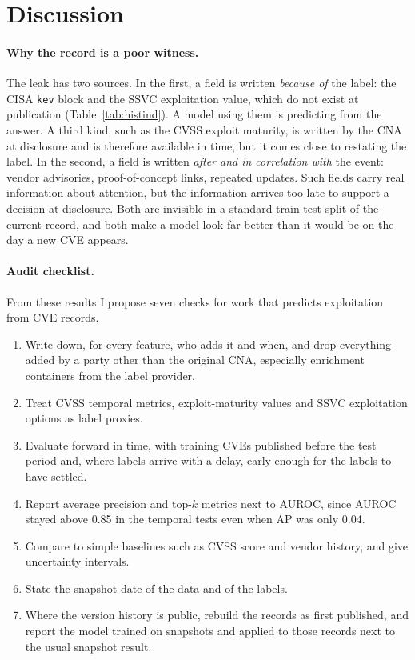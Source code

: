 \documentclass[conference,a4paper]{IEEEtran}
\begin{document}
\section{Discussion}

\paragraph{Why the record is a poor witness.} The leak has two sources. In the first, a field is written \emph{because of} the label: the CISA \texttt{kev} block and the SSVC exploitation value, which do not exist at publication (Table~\ref{tab:histind}). A model using them is predicting from the answer. A third kind, such as the CVSS exploit maturity, is written by the CNA at disclosure and is therefore available in time, but it comes close to restating the label. In the second, a field is written \emph{after and in correlation with} the event: vendor advisories, proof-of-concept links, repeated updates. Such fields carry real information about attention, but the information arrives too late to support a decision at disclosure. Both are invisible in a standard train-test split of the current record, and both make a model look far better than it would be on the day a new CVE appears.

\paragraph{Audit checklist.} From these results I propose seven checks for work that predicts exploitation from CVE records.
\begin{enumerate}
\item Write down, for every feature, who adds it and when, and drop everything added by a party other than the original CNA, especially enrichment containers from the label provider.
\item Treat CVSS temporal metrics, exploit-maturity values and SSVC exploitation options as label proxies.
\item Evaluate forward in time, with training CVEs published before the test period and, where labels arrive with a delay, early enough for the labels to have settled.
\item Report average precision and top-$k$ metrics next to AUROC, since AUROC stayed above 0.85 in the temporal tests even when AP was only 0.04.
\item Compare to simple baselines such as CVSS score and vendor history, and give uncertainty intervals.
\item State the snapshot date of the data and of the labels.
\item Where the version history is public, rebuild the records as first published, and report the model trained on snapshots and applied to those records next to the usual snapshot result.
\end{enumerate}
\end{document}
